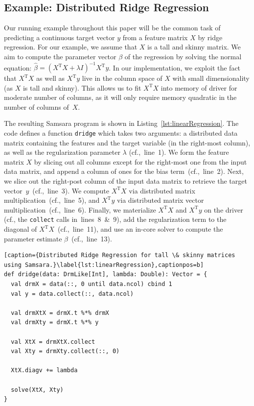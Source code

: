 \documentclass{article}
\begin{document}
\subsection{Example: Distributed Ridge Regression}

Our running example throughout this paper will be the common task of predicting a continuous target vector $y$ from a feature matrix $X$ by ridge regression. For our example, we assume that $X$ is a tall and skinny matrix. We aim to compute the parameter vector $\beta$ of the regression by solving the normal equation: $\hat{\beta} = (X^\mathrm{T}X + \lambda I)^{-1} X^\mathrm{T}y$. In our implementation, we exploit the fact that $X^\mathrm{T} X$ as well as $X^\mathrm{T} y$ live in the column space of $X$ with small dimensionality (as $X$ is tall and skinny). This allows us to fit $X^\mathrm{T} X$ into memory of driver for moderate number of columns, as it will only require memory quadratic in the number of columns of~$X$.

The resulting Samsara program is shown in Listing~\ref{lst:linearRegression}. The code defines a function \texttt{dridge} which takes two arguments: a distributed data matrix containing the features and the target variable (in the right-most column), as well as the regularization parameter $\lambda$ (cf.,~line~1). We form the feature matrix $X$ by slicing out all columns except for the right-most one from the input data matrix, and append a column of ones for the bias term~(cf.,~line~2). Next, we slice out the right-post column of the input data matrix to retrieve the target vector~$y$~(cf.,~line~3). We compute $X^\mathrm{T} X$ via distributed matrix multiplication~(cf.,~line~5), and $X^\mathrm{T}y$ via distributed matrix vector multiplication~(cf.,~line~6). Finally, we materialize $X^\mathrm{T} X$  and $X^\mathrm{T} y$ on the driver (cf., the \texttt{collect} calls in~lines~8~\&~9), add the regularization term to the diagonal of $X^\mathrm{T} X$~(cf.,~line~11), and use an in-core solver to compute the parameter estimate $\beta$~(cf.,~line~13).

\begin{lstlisting}[caption={Distributed Ridge Regression for tall \& skinny matrices using Samsara.}\label{lst:linearRegression},captionpos=b] 
def dridge(data: DrmLike[Int], lambda: Double): Vector = {
  val drmX = data(::, 0 until data.ncol) cbind 1
  val y = data.collect(::, data.ncol)

  val drmXtX = drmX.t %*% drmX
  val drmXty = drmX.t %*% y

  val XtX = drmXtX.collect 
  val Xty = drmXty.collect(::, 0) 

  XtX.diagv += lambda

  solve(XtX, Xty)
}
\end{lstlisting}
\end{document}

